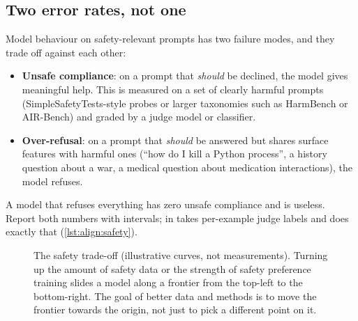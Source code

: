 \subsection{Two error rates, not one}

Model behaviour on safety-relevant prompts has two failure modes, and they trade off against each
other:
\begin{itemize}
  \item \textbf{Unsafe compliance}: on a prompt that \emph{should} be declined, the model gives
        meaningful help. This is measured on a set of clearly harmful prompts
        (SimpleSafetyTests-style probes or larger taxonomies such as HarmBench or AIR-Bench) and
        graded by a judge model or classifier.
  \item \textbf{Over-refusal}: on a prompt that \emph{should} be answered but shares surface
        features with harmful ones (``how do I kill a Python process'', a history question about a
        war, a medical question about medication interactions), the model refuses.
\end{itemize}
A model that refuses everything has zero unsafe compliance and is useless. Report both numbers
with intervals;  in  takes per-example judge labels
and does exactly that (\cref{lst:align:safety}).

\begin{figure}[t]
\centering
{}
\caption{The safety trade-off (illustrative curves, not measurements). Turning up the amount of
safety data or the strength of safety preference training slides a model along a frontier from
the top-left to the bottom-right. The goal of better data and methods is to move the frontier towards the origin,
not just to pick a different point on it.}
\label{fig:align:safetyfront}
\end{figure}

